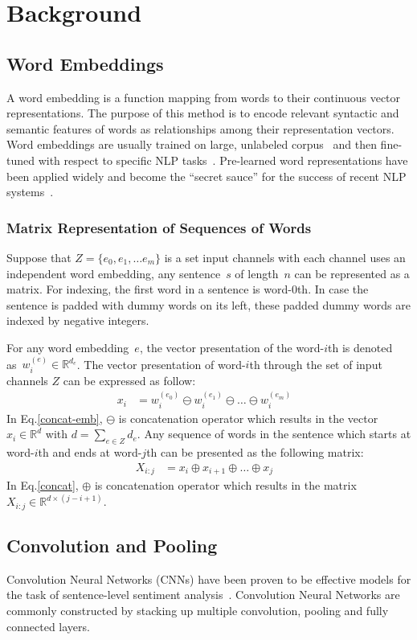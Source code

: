 \section{Background}
\subsection{Word Embeddings}
A word embedding is a function mapping from words to their continuous vector representations.
The purpose of this method is to encode relevant syntactic and semantic features of words as relationships among their representation vectors.
Word embeddings are usually trained on large, unlabeled corpus~\cite{glove,word2vec} and then fine-tuned with respect to specific NLP tasks~\cite{treeLSTM,KimCNN}.
Pre-learned word representations have been applied widely and become the ``secret sauce'' for the success of recent NLP systems~\cite{Luong_betterword}.
\subsubsection{Matrix Representation of Sequences of Words}
Suppose that \(Z = \{e_0, e_1, \ldots e_m\}\) is a set input channels with each channel uses an independent word embedding, any sentence~\(s\) of length~\(n\) can be represented as a matrix.
For indexing, the first word in a sentence is word-\(0\)th.
In case the sentence is padded with dummy words on its left, these padded dummy words are indexed by negative integers.

For any word embedding~\(e\), the vector presentation of the word-\(i\)th is denoted as~\(w^{(e)}_i \in \mathbb{R}^{d_e}\).
The vector presentation of word-\(i\)th through the set of input channels \(Z\) can be expressed as follow:
\begin{align}
 x_i &= w^{(e_0)}_i \ominus w^{(e_1)}_i \ominus  \ldots \ominus w^{(e_m)}_i&\label{concat-emb}
\end{align}
In Eq.\eqref{concat-emb}, \(\ominus\) is concatenation operator which results in the vector \(x_i \in \mathbb{R}^{d}\) with \(d = \sum_{e \in Z} d_e\).
Any sequence of words in the sentence which starts at word-\(i\)th and ends at word-\(j\)th can be presented as the following matrix:
\begin{align}
X_{i:j} &= x_i \oplus x_{i+1} \oplus \ldots \oplus x_j &\label{concat}
\end{align}
In Eq.\eqref{concat}, \(\oplus\) is concatenation operator which results in the matrix \(X_{i:j} \in \mathbb{R}^{d \times (j-i+1)}\).
\subsection{Convolution and Pooling}\label{sec:cnn}
Convolution Neural Networks (CNNs) have been proven to be effective models for the task of sentence-level sentiment analysis~\cite{KimCNN, DCNN,2-layer-cnn}.
Convolution Neural Networks are commonly constructed by stacking up multiple convolution, pooling and fully connected layers.
